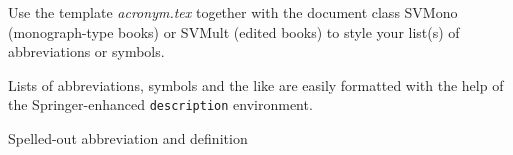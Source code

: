 %
%


Use the template \emph{acronym.tex} together with the document class SVMono (monograph-type books) or SVMult (edited books) to style your list(s) of abbreviations or symbols.

Lists of abbreviations, symbols and the like are easily formatted with the help of the Springer-enhanced \verb|description| environment.

\begin{description}[CABR]
\item[ABC]{Spelled-out abbreviation and definition}
\end{description}